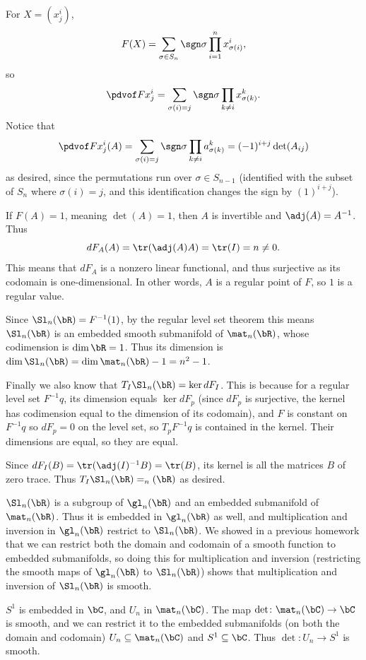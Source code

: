     For $X=(x^i_j)$,
    $$ F(X) = \sum_{\sigma\in S_n}\sgn\sigma\prod_{i=1}^n x^i_{\sigma(i)} , $$
    so
    $$ \pdvof F{x^i_j} = \sum_{\sigma(i)=j}\sgn\sigma\prod_{k\neq i} x^k_{\sigma(k)} . $$
    Notice that
    $$ \pdvof F{x^i_j}(A) = \sum_{\sigma(i)=j}\sgn\sigma\prod_{k\neq i}a^k_{\sigma(k)} = (-1)^{i+j}\det(A_{ij}) $$
    as desired, since the permutations run over $\sigma\in S_{n-1}$ (identified with the subset of $S_n$ where $\sigma(i)=j$, and this
    identification changes the sign by $(1)^{i+j}$).

    \item If $F(A)=1$, meaning $\det(A)=1$, then $A$ is invertible and $\adj(A)=A^{-1}$.
    Thus
    $$ dF_A(A) = \tr(\adj(A)A) = \tr(I) = n \neq 0 . $$
    This means that $dF_A$ is a nonzero linear functional, and thus surjective as its codomain is one-dimensional.
    In other words, $A$ is a regular point of $F$, so $1$ is a regular value.

    Since $\Sl_n(\bR)=F^{-1}(1)$, by the regular level set theorem this means $\Sl_n(\bR)$ is an embedded smooth submanifold of
    $\mat_n(\bR)$, whose codimension is $\dim\bR=1$.
    Thus its dimension is $\dim\Sl_n(\bR)=\dim\mat_n(\bR)-1=n^2-1$.

    Finally we also know that $T_I\Sl_n(\bR)=\ker dF_I$.
    This is because for a regular level set $F^{-1}q$, its dimension equals $\ker dF_p$ (since $dF_p$ is surjective, the kernel has codimension
    equal to the dimension of its codomain), and $F$ is constant on $F^{-1}q$ so $dF_p=0$ on the level set, so $T_pF^{-1}q$ is contained
    in the kernel.
    Their dimensions are equal, so they are equal.

    Since $dF_I(B)=\tr(\adj(I)^{-1}B)=\tr(B)$, its kernel is all the matrices $B$ of zero trace.
    Thus $T_I\Sl_n(\bR)=\sl_n(\bR)$ as desired.

    \item $\Sl_n(\bR)$ is a subgroup of $\gl_n(\bR)$ and an embedded submanifold of $\mat_n(\bR)$.
    Thus it is embedded in $\gl_n(\bR)$ as well, and multiplication and inversion in $\gl_n(\bR)$ restrict to $\Sl_n(\bR)$.
    We showed in a previous homework that we can restrict both the domain and codomain of a smooth function to embedded submanifolds,
    so doing this for multiplication and inversion (restricting the smooth maps of $\gl_n(\bR)$ to $\Sl_n(\bR)$) shows that
    multiplication and inversion of $\Sl_n(\bR)$ is smooth.

    \item $S^1$ is embedded in $\bC$, and $U_n$ in $\mat_n(\bC)$.
    The map $\det\colon\mat_n(\bC)\to\bC$ is smooth, and we can restrict it to the embedded submanifolds (on both the domain and codomain)
    $U_n\subseteq\mat_n(\bC)$ and $S^1\subseteq\bC$.
    Thus $\det\colon U_n\to S^1$ is smooth.

